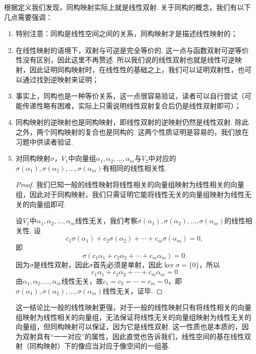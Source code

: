根据定义我们发现，同构映射实际上就是线性双射. 关于同构的概念，我们有以下几点需要强调：
\begin{enumerate}
    \item 特别注意：同构是线性空间之间的关系，同构映射才是描述线性映射的；

    \item 在线性映射的语境下，双射与可逆是完全等价的. 这一点与函数双射可逆等价性没有区别，因此这里不再赘述. 所以我们说的线性双射也就是线性可逆映射，因此证明同构映射时，在线性性的基础之上，我们可以证明双射性，也可以通过找到逆映射来证明；

    \item 事实上，同构也是一种等价关系，这一点很容易验证，读者可以自行尝试（可能传递性略有困难，实际上只需说明线性双射复合后仍是线性双射即可）；

    \item 同构映射的逆映射也是同构映射，即线性双射的逆映射仍然是线性双射. 除此之外，两个同构映射的复合也是同构的. 这两个性质证明是容易的，我们放在习题中供读者验证.

    \item 对同构映射$\sigma$，$V_1$中向量组$ \alpha_1,\alpha_2,\ldots,\alpha_m $与$V_2$中对应的$ \sigma(\alpha_1),\sigma(\alpha_2),\ldots,\sigma(\alpha_m) $有相同的线性相关性.

          \begin{proof}
              我们已知一般的线性映射将线性相关的向量组映射为线性相关的向量组，因此对于同构映射，我们只需证明它能将线性无关的向量组映射为线性无关的向量组即可.

              设$V_1$中$\alpha_1,\alpha_2,\ldots,\alpha_m$线性无关，我们考察$\sigma(\alpha_1),\sigma(\alpha_2),\ldots,\sigma(\alpha_m)$的线性相关性. 设
              \[c_1\sigma(\alpha_1)+c_2\sigma(\alpha_2)+\cdots+c_m\sigma(\alpha_m)=0,\]
              即
              \[\sigma(c_1\alpha_1+c_2\alpha_2+\cdots+c_m\alpha_m)=0.\]
              因为$\sigma$是线性双射，因此$\sigma$首先必须是单射，因此$\ker\sigma=\{0\}$，所以
              \[c_1\alpha_1+c_2\alpha_2+\cdots+c_m\alpha_m=0\]
              由$\alpha_1,\alpha_2,\ldots,\alpha_m$线性无关，故$c_1=c_2=\cdots=c_m=0$，即$\sigma(\alpha_1),\sigma(\alpha_2),\ldots,\sigma(\alpha_m)$线性无关，证毕.
          \end{proof}

          这一结论比一般的线性映射更强，对于一般的线性映射只有将线性相关的向量组映射为线性相关的向量组，无法保证将线性无关的向量组映射为线性无关的向量组，但同构映射可以保证，因为它是线性双射. 这一性质也是本质的，因为双射具有``一一对应''的属性，因此直觉也告诉我们，线性空间的基在线性双射（同构映射）下的像应当对应于像空间的一组基.


\end{enumerate}
